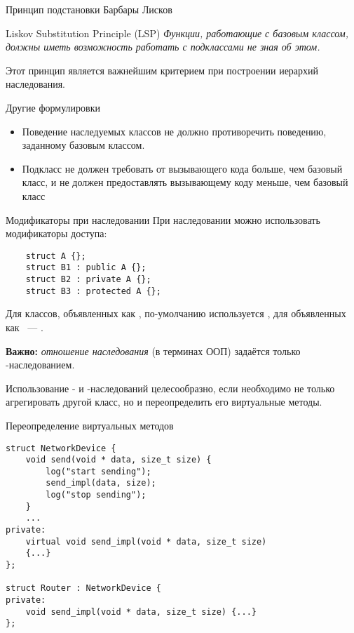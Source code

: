 \documentclass{beamer}
\begin{document}
\begin{frame}[fragile]{Принцип подстановки Барбары Лисков}
\begin{block}{Liskov Substitution Principle (LSP)} 
\em\centering  Функции, работающие с базовым классом, должны иметь 
    возможность работать с подклассами не зная об этом.
\end{block}
\vspace{5mm}
    
Этот принцип является важнейшим критерием при построении иерархий наследования. 

\begin{block}{Другие формулировки}
\begin{itemize}
    \item Поведение наследуемых классов не должно противоречить поведению,
            заданному базовым классом.
    \item Подкласс не должен требовать от вызывающего кода больше, чем базовый
        класс, и не должен предоставлять вызывающему коду меньше, чем базовый
        класс 
\end{itemize}
\end{block}
\end{frame}

\begin{frame}[fragile]{Модификаторы при наследовании}
    При наследовании можно использовать модификаторы доступа:
\begin{lstlisting}
    struct A {};
    struct B1 : public A {};
    struct B2 : private A {};
    struct B3 : protected A {};
\end{lstlisting}
Для классов, объявленных как , по-умолчанию используется
, для объявленных как ~— .
\vspace{3mm}

{\bf Важно:} {\em отношение наследования} (в терминах ООП) задаётся только -наследованием.
\vspace{3mm}

Использование - и -наследований целесообразно,
если необходимо не только агрегировать другой класс, но и переопределить его виртуальные методы.
\end{frame}

\begin{frame}[fragile]{Переопределение  виртуальных методов}
    \begin{lstlisting}[basicstyle=\fontsize{9pt}{1em}\ttfamily,commentstyle=\fontsize{9pt}{1em}\ttfamily\color{MOOCGreen}]
struct NetworkDevice {
    void send(void * data, size_t size) {
        log("start sending");
        send_impl(data, size);
        log("stop sending");
    }
    ...
private:
    virtual void send_impl(void * data, size_t size) 
    {...}
};

struct Router : NetworkDevice {
private:
    void send_impl(void * data, size_t size) {...}
};
    \end{lstlisting}
\end{frame}
\end{document}
